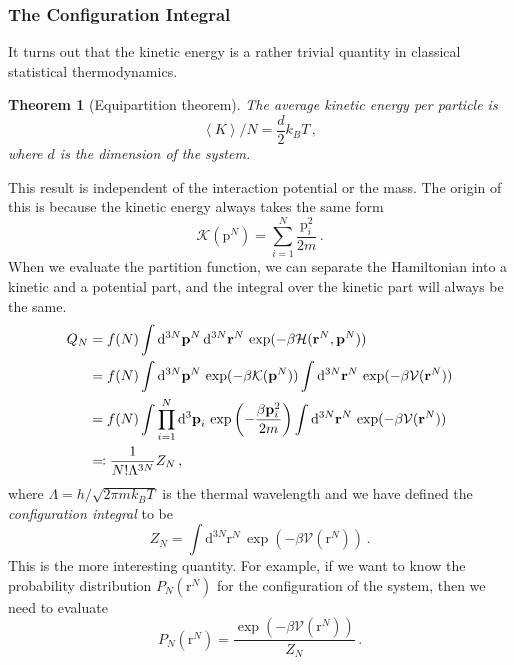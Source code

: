 \documentclass{article}
\theoremstyle{plain}\theoremheaderfont{\normalfont\itshape}\theorembodyfont{\rmfamily}\theoremseparator{.}\newtheorem*{rem}{Remark}\newtheorem*{ex}{Example}\newtheorem*{proof}{Proof}\newtheorem*{altp}{Alternative proof}
\theoremstyle{plain}\theoremheaderfont{\normalfont\bfseries}\theorembodyfont{\rmfamily}\theoremseparator{.}\newtheorem{thm}{Theorem}[section]\newtheorem{lem}[thm]{Lemma}\newtheorem{prop}[thm]{Proposition}\newtheorem*{cor}{Corollary}\newtheorem{defn}[thm]{Definition}\newtheorem{clm}[thm]{Claim}\newtheorem{clminproof}{Claim}\newtheorem{alg}[thm]{Algorithm}\newtheorem{hyp}[thm]{Hypothesis}\newtheorem{law}[thm]{Law}
\theoremstyle{break}\theoremheaderfont{\normalfont\itshape}\theorembodyfont{\rmfamily}\theoremseparator{.\medskip}\newtheorem*{proofskip}{Proof}\newtheorem*{exs}{Examples}\newtheorem*{rems}{Remarks}
\theoremstyle{break}\theoremheaderfont{\normalfont\bfseries}\theorembodyfont{\rmfamily}\theoremseparator{.\medskip}\newtheorem{lemskip}[thm]{Lemma}\newtheorem{defnskip}[thm]{Definition}\newtheorem{propskip}[thm]{Proposition}\newtheorem{thmskip}[thm]{Theorem}
\numberwithin{equation}{section}
\newcommand{\dd}[2][]{\mathrm{d}^{#1} #2\,}
\newcommand{\eval}[1]{\left\langle #1 \right\rangle}
\newcommand{\vb}[1]{\bm{\mathrm{#1}}}
\begin{document}
    \subsubsection{The Configuration Integral}
    It turns out that the kinetic energy is a rather trivial quantity in classical statistical thermodynamics.
    \begin{thm}[Equipartition theorem]
        The average kinetic energy per particle is
        \begin{equation}
            \eval{K}/N=\frac{d}{2}k_B T\,,
        \end{equation}
        where \(d\) is the dimension of the system.
    \end{thm}
    This result is independent of the interaction potential or the mass. The origin of this is because the kinetic energy always takes the same form
    \begin{equation}
        \mathcal{K}(\vb{p}^N)=\sum_{i=1}^{N}\frac{\vb{p}_i^2}{2m}\,.
    \end{equation}
    When we evaluate the partition function, we can separate the Hamiltonian into a kinetic and a potential part, and the integral over the kinetic part will always be the same.
    \begin{align}
        Q_N&=f(N)\int\dd[3N]{\vb{p}^N}\dd[3N]{\vb{r}^N}\exp(-\beta \mathcal{H}(\vb{r}^N,\vb{p}^N))\notag\\
        &=f(N)\int\dd[3N]{\vb{p}^N}\exp(-\beta \mathcal{K}(\vb{p}^N))\int\dd[3N]{\vb{r}^N}\exp(-\beta \mathcal{V}(\vb{r}^N))\notag \\
        &=f(N)\int\prod_{i=1}^{N}\dd[3]{\vb{p}_i}\exp\left(-\frac{\beta\vb{p}_i^2}{2m}\right)\int\dd[3N]{\vb{r}^N}\exp(-\beta \mathcal{V}(\vb{r}^N))\notag\\
        &\eqqcolon\frac{1}{N!\Lambda^{3N}} Z_N\,,
    \end{align}
    where \(\Lambda=h/\sqrt{2\pi m k_B T}\) is the thermal wavelength and we have defined the \textit{configuration integral} to be
    \begin{equation}\label{configuration_integral}
        Z_N=\int\dd[3N]{\vb{r}^N}\exp(-\beta \mathcal{V}(\vb{r}^N))\,.
    \end{equation}
    This is the more interesting quantity. For example, if we want to know the probability distribution \(P_N(\vb{r}^N)\) for the configuration of the system, then we need to evaluate
    \begin{equation}
        P_N(\vb{r}^N)=\frac{\exp(-\beta \mathcal{V}(\vb{r}^N))}{Z_N}\,.
    \end{equation}
\end{document}
